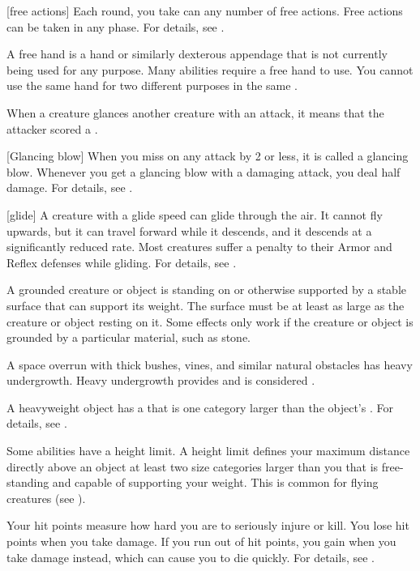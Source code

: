 [free actions] Each round, you take can any number of free actions.
Free actions can be taken in any phase.
For details, see .

 A free hand is a hand or similarly dexterous appendage that is not currently being used for any purpose.
Many abilities require a free hand to use.
You cannot use the same hand for two different purposes in the same .

 When a creature glances another creature with an attack, it means that the attacker scored a .

[Glancing blow] When you miss on any attack by 2 or less, it is called a glancing blow.
Whenever you get a glancing blow with a damaging attack, you deal half damage.
For details, see .

[glide] A creature with a glide speed can glide through the air.
It cannot fly upwards, but it can travel forward while it descends, and it descends at a significantly reduced rate.
Most creatures suffer a  penalty to their Armor and Reflex defenses while gliding.
For details, see .

 A grounded creature or object is standing on or otherwise supported by a stable surface that can support its weight.
The surface must be at least as large as the creature or object resting on it.
Some effects only work if the creature or object is grounded by a particular material, such as stone. 

 A space overrun with thick bushes, vines, and similar natural obstacles has heavy undergrowth.
Heavy undergrowth provides  and is considered .

 A heavyweight object has a  that is one category larger than the object's .
For details, see .

 Some abilities have a height limit.
A height limit defines your maximum distance directly above an object at least two size categories larger than you that is free-standing and capable of supporting your weight.
This is common for flying creatures (see ).

 Your hit points measure how hard you are to seriously injure or kill.
You lose hit points when you take damage.
If you run out of hit points, you gain  when you take damage instead, which can cause you to die quickly.
For details, see .

